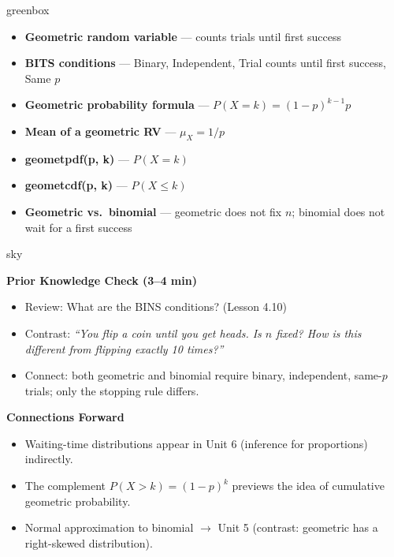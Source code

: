 \documentclass[10pt]{article}
\begin{document}
\begin{skillbox}{greenbox}
\begin{minipage}[t]{0.48\linewidth}
    \begin{itemize}
        \item \textbf{Geometric random variable} --- counts trials until first
              success
        \item \textbf{BITS conditions} --- Binary, Independent, Trial counts
              until first success, Same $p$
        \item \textbf{Geometric probability formula} ---
              $P(X = k) = (1-p)^{k-1}p$
    \end{itemize}
\end{minipage}
\hfill
\begin{minipage}[t]{0.48\linewidth}
    \begin{itemize}
        \item \textbf{Mean of a geometric RV} --- $\mu_X = 1/p$
        \item \textbf{geometpdf(p, k)} --- $P(X = k)$
        \item \textbf{geometcdf(p, k)} --- $P(X \le k)$
        \item \textbf{Geometric vs.\ binomial} --- geometric does not fix $n$;
              binomial does not wait for a first success
    \end{itemize}
\end{minipage}
\end{skillbox}

\begin{skillbox}{sky}
\begin{minipage}[t]{0.48\linewidth}
    \textbf{Prior Knowledge Check (3--4 min)}
    \begin{itemize}
        \item Review: What are the BINS conditions? (Lesson 4.10)
        \item Contrast: \textit{``You flip a coin until you get heads. Is $n$ fixed?
              How is this different from flipping exactly 10 times?''}
        \item Connect: both geometric and binomial require binary, independent,
              same-$p$ trials; only the stopping rule differs.
    \end{itemize}
\end{minipage}
\hfill
\begin{minipage}[t]{0.48\linewidth}
    \textbf{Connections Forward}
    \begin{itemize}
        \item Waiting-time distributions appear in Unit 6 (inference for
              proportions) indirectly.
        \item The complement $P(X > k) = (1-p)^k$ previews the idea of
              cumulative geometric probability.
        \item Normal approximation to binomial $\to$ Unit 5 (contrast:
              geometric has a right-skewed distribution).
    \end{itemize}
\end{minipage}
\end{skillbox}
\end{document}

